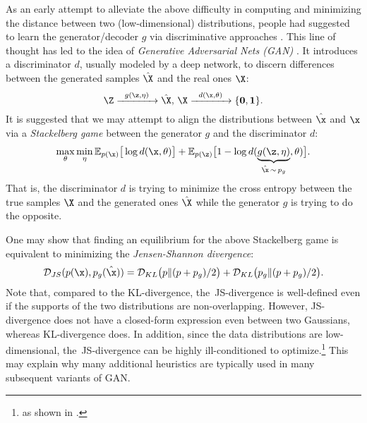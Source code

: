 \documentclass[../../book-main.tex]{subfiles}
\begin{document}
As an early attempt to alleviate the above difficulty in computing and minimizing the distance between two (low-dimensional)  distributions, people had suggested to learn the generator/decoder $g$ via discriminative approaches \cite{Tu-2007}. This line of thought has led to  the idea of {\em Generative Adversarial Nets (GAN)} \cite{goodfellow2014generative}. It introduces a discriminator $d$, usually modeled by a deep network, to discern differences between the generated samples $\hat \X$ and the real ones $\X$:
\begin{equation}
 \Z \xrightarrow{\hspace{2mm} g(\z,\eta) \hspace{2mm}} \hat \X, \, \X \xrightarrow{\hspace{2mm} d(\x, \theta)\hspace{2mm}} \{\mathbf 0, \mathbf 1\}.
 \label{eqn:GAN}
\end{equation}
It is suggested that we may attempt to align the distributions between $\hat \x$ and $\x$ via a {\em Stackelberg game} between the generator $g$ and the discriminator $d$:
\begin{equation}
\max_{\theta}\min_{\eta} \mathbb{E}_{p({\x})}\big[\log d(\x,\theta)\big] + \mathbb{E}_{p({\z})}\big[1 - \log d(\underbrace{g(\z,\eta)}_{\hat \x \,\sim\, p_g},\theta)\big].
\end{equation}
That is, the discriminator $d$ is trying to minimize the cross entropy between the true samples $\X$ and the generated ones $\hat \X$ while the generator $g$ is trying to do  the opposite. 

One may show that finding an equilibrium for the above Stackelberg game is equivalent to minimizing the {\em Jensen-Shannon divergence}:
\begin{equation}
    \mathcal{D}_{JS}(p(\x), p_g(\hat \x)) = \mathcal{D}_{KL}\big(p \| (p + p_g)/{2}\big) + \mathcal{D}_{KL}\big(p_g \| (p + p_g)/{2}\big).
\end{equation}
Note that, compared to the KL-divergence, the~JS-divergence is well-defined even if the supports of the two distributions are non-overlapping. However, JS-divergence does not have a closed-form expression even between two Gaussians, whereas KL-divergence does. In addition, since the data distributions are low-dimensional, the~JS-divergence can be highly ill-conditioned to optimize.\footnote{as shown in \cite{arjovsky2017wasserstein}.} This may explain why many additional heuristics are typically used in many subsequent variants of GAN. 
\end{document}
